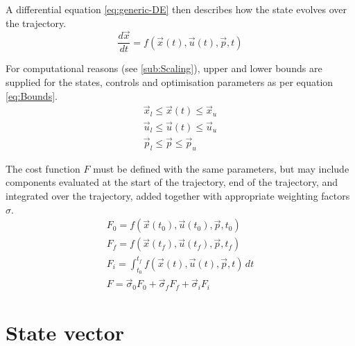 A differential equation \eqref{eq:generic-DE} then describes how the state evolves over the trajectory.
\begin{equation}\label{eq:generic-DE}
\frac{d\vec{x}}{dt} = f(\vec{x}(t),\vec{u}(t),\vec{p},t)
\end{equation}

For computational reasons (see \autoref{sub:Scaling}), upper and lower bounds are supplied for the states, controls and optimisation parameters as per equation \eqref{eq:Bounds}.
\begin{subequations} \label{eq:Bounds}
\begin{gather}
\vec{x}_l\le\vec{x}(t)\le\vec{x}_u \label{eq:state-bounds}\\
\vec{u}_l\le\vec{u}(t)\le\vec{u}_u \label{eq:control-bounds}\\
\vec{p}_l\le\vec{p}\le\vec{p}_u \label{eq:parameter-bounds}
\end{gather}
\end{subequations}

The cost function $F$ must be defined with the same parameters, but may include components evaluated at the start of the trajectory, end of the trajectory, and integrated over the trajectory, added together with appropriate weighting factors $\sigma$.
\begin{subequations}
\begin{gather}
F_0=f(\vec{x}(t_0),\vec{u}(t_0),\vec{p},t_0) \label{eq:init-cost}\\
F_f=f(\vec{x}(t_f),\vec{u}(t_f),\vec{p},t_f) \label{eq:final-cost}\\
F_i=\int^{t_f}_{t_0}f(\vec{x}(t),\vec{u}(t),\vec{p},t)\,dt \label{eq:integral-cost} \\
F = \vec\sigma_0 F_0+\vec\sigma_f F_f+\vec\sigma_i F_i \label{eq:total-cost}
\end{gather}
\end{subequations}

\section{State vector} \label{sec:state-vector}


